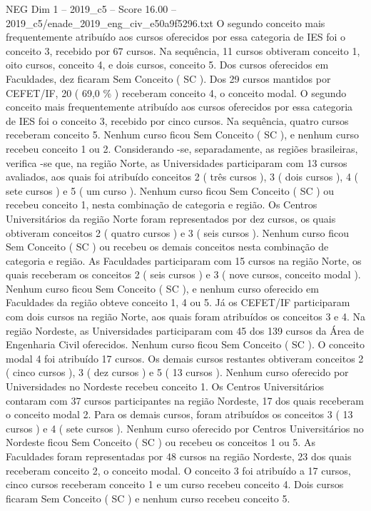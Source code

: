 \begin{textsample}{NEG Dim 1 – 2019\_c5 – Score 16.00 – 2019\_c5/enade\_2019\_eng\_civ\_e50a9f5296.txt}
O segundo conceito mais frequentemente atribuído aos cursos oferecidos por essa categoria de IES foi o conceito 3, recebido por 67 cursos.
Na sequência, 11 cursos obtiveram conceito 1, oito cursos, conceito 4, e dois cursos, conceito 5.
Dos cursos oferecidos em Faculdades, dez ficaram Sem Conceito ( SC ).
Dos 29 cursos mantidos por CEFET/IF, 20 ( 69,0 \% ) receberam conceito 4, o conceito modal.
O segundo conceito mais frequentemente atribuído aos cursos oferecidos por essa categoria de IES foi o conceito 3, recebido por cinco cursos.
Na sequência, quatro cursos receberam conceito 5.
Nenhum curso ficou Sem Conceito ( SC ), e nenhum curso recebeu conceito 1 ou 2.
Considerando -se, separadamente, as regiões brasileiras, verifica -se que, na região Norte, as Universidades participaram com 13 cursos avaliados, aos quais foi atribuído conceitos 2 ( três cursos ), 3 ( dois cursos ), 4 ( sete cursos ) e 5 ( um curso ).
Nenhum curso ficou Sem Conceito ( SC ) ou recebeu conceito 1, nesta combinação de categoria e região.
Os Centros Universitários da região Norte foram representados por dez cursos, os quais obtiveram conceitos 2 ( quatro cursos ) e 3 ( seis cursos ).
Nenhum curso ficou Sem Conceito ( SC ) ou recebeu os demais conceitos nesta combinação de categoria e região.
As Faculdades participaram com 15 cursos na região Norte, os quais receberam os conceitos 2 ( seis cursos ) e 3 ( nove cursos, conceito modal ).
Nenhum curso ficou Sem Conceito ( SC ), e nenhum curso oferecido em Faculdades da região obteve conceito 1, 4 ou 5.
Já os CEFET/IF participaram com dois cursos na região Norte, aos quais foram atribuídos os conceitos 3 e 4.
Na região Nordeste, as Universidades participaram com 45 dos 139 cursos da Área de Engenharia Civil oferecidos.
Nenhum curso ficou Sem Conceito ( SC ).
O conceito modal 4 foi atribuído 17 cursos.
Os demais cursos restantes obtiveram conceitos 2 ( cinco cursos ), 3 ( dez cursos ) e 5 ( 13 cursos ).
Nenhum curso oferecido por Universidades no Nordeste recebeu conceito 1.
Os Centros Universitários contaram com 37 cursos participantes na região Nordeste, 17 dos quais receberam o conceito modal 2.
Para os demais cursos, foram atribuídos os conceitos 3 ( 13 cursos ) e 4 ( sete cursos ).
Nenhum curso oferecido por Centros Universitários no Nordeste ficou Sem Conceito ( SC ) ou recebeu os conceitos 1 ou 5.
As Faculdades foram representadas por 48 cursos na região Nordeste, 23 dos quais receberam conceito 2, o conceito modal.
O conceito 3 foi atribuído a 17 cursos, cinco cursos receberam conceito 1 e um curso recebeu conceito 4.
Dois cursos ficaram Sem Conceito ( SC ) e nenhum curso recebeu conceito 5.

\end{textsample}
